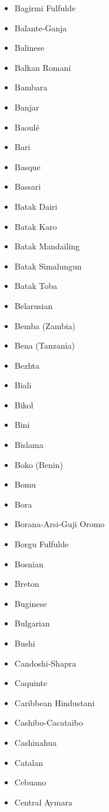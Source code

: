 \documentclass[paper=a4, 12pt]{scrbook}
\begin{document}
\begin{multicols}{3}
\begin{itemize}
        \item Bagirmi Fulfulde
        \item Balante-Ganja
        \item Balinese
        \item Balkan Romani
        \item Bambara
        \item Banjar
        \item Baoulé
        \item Bari
        \item Basque
        \item Bassari
        \item Batak Dairi
        \item Batak Karo
        \item Batak Mandailing
        \item Batak Simalungun
        \item Batak Toba
        \item Belarusian
        \item Bemba (Zambia)
        \item Bena (Tanzania)
        \item Bezhta
        \item Biali
        \item Bikol
        \item Bini
        \item Bislama
        \item Boko (Benin)
        \item Bomu
        \item Bora
        \item Borana-Arsi-Guji Oromo
        \item Borgu Fulfulde
        \item Bosnian
        \item Breton
        \item Buginese
        \item Bulgarian
        \item Bushi
        \item Candoshi-Shapra
        \item Caquinte
        \item Caribbean Hindustani
        \item Cashibo-Cacataibo
        \item Cashinahua
        \item Catalan
        \item Cebuano
        \item Central Aymara

\end{itemize}
\end{multicols}
\end{document}

